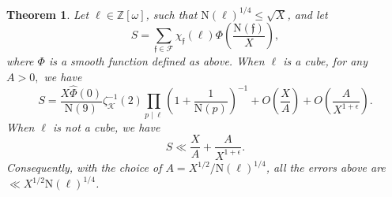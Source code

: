 \documentclass[11pt]{amsart}
\newcommand{\norm}{\mathrm{N}}
\newtheorem{theorem}[prop]{Theorem}
\numberwithin{equation}{section}
\theoremstyle{remark}
\begin{document}
\begin{theorem}
\label{theorem S_1}
    Let $\ell\in\mathbb{Z}[\omega]$, such that $\norm(\ell)^{1/4}\le \sqrt{X}$, and let
    $$S=\sum_{\mathfrak{f}\in \mathcal{F}}\chi_{\mathfrak{f}}(\ell)\Phi\left(\frac{\norm(\mathfrak{f})}{X}\right),$$
    where $\Phi$ is a smooth function defined as above.   
    When $\ell$ is a cube, for any $A>0,$ we have
    $$S=\frac{X\widehat{\Phi}(0)}{\norm(9)}  \zeta^{-1}_\mathcal{K}(2)  \prod_{p\mid \ell}\left(1+\frac{1}{\norm(p)}\right)^{-1} +O\left(\frac{X}{A}\right)+O\left(\frac{A}{X^{1+\epsilon}}\right).$$
    When $\ell$ is not a cube, we have
    $$S
    \ll
    \frac{X}{A}+\frac{A}{X^{1+\epsilon}}.
    $$
Consequently, with the choice of $A=X^{1/2}/\norm(\ell)^{1/4}$, all the errors above are
$\ll X^{1/2}\norm(\ell)^{1/4}$.
\end{theorem}
\end{document}
